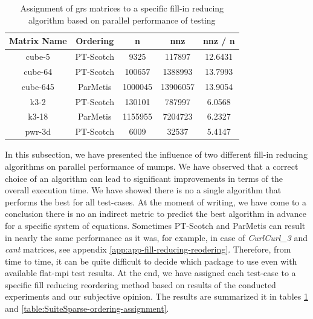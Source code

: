 \begin{table}[htpb]
\centering
\begin{tabular}{|c|c|c|c|c|}
\hline
Matrix Name & Ordering  & n       & nnz      & nnz / n \\ \hline
cube-5      & PT-Scotch & 9325    & 117897   & 12.6431 \\ \hline
cube-64     & PT-Scotch & 100657  & 1388993  & 13.7993 \\ \hline
cube-645    & ParMetis  & 1000045 & 13906057 & 13.9054 \\ \hline
k3-2        & PT-Scotch & 130101  & 787997   & 6.0568  \\ \hline
k3-18       & ParMetis  & 1155955 & 7204723  & 6.2327  \\ \hline
pwr-3d      & PT-Scotch & 6009    & 32537    & 5.4147  \\ \hline
\end{tabular}
\caption{Assignment of \gls{grs} matrices to a specific fill-in reducing algorithm based on parallel performance of testing}
\label{table:GRS-ordering-assignment}
\end{table}


In this subsection, we have presented the influence of  two different fill-in reducing algorithms on parallel performance of \gls{mumps}. We have observed that a correct choice of an algorithm can lead to significant improvements in terms of the overall execution time. We have showed there is no a single algorithm that performs the best for all test-cases. At the moment of writing, we have come to a conclusion there is no an indirect metric to predict the best algorithm in advance for a specific system of equations. Sometimes PT-Scotch and ParMetis can result in nearly the same performance as it was, for example, in case of \textit{CurlCurl\_3} and \textit{cant} matrices, see appendix \ref{app:app-fill-reducing-reodering}. Therefore, from time to time, it can be quite difficult to decide which package to use even with available flat-\gls{mpi} test results. At the end, we have assigned each test-case to a specific fill reducing reordering method based on results of the conducted experiments and our subjective opinion. The results are summarized it in tables \ref{table:GRS-ordering-assignment} and \ref{table:SuiteSparse-ordering-assignment}. \\ 


